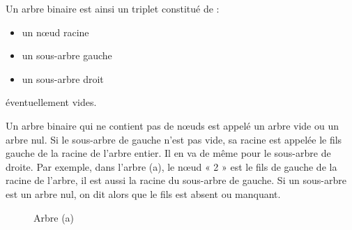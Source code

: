 \documentclass{report}
\begin{document}
Un arbre binaire est ainsi un triplet constitué de :
\begin{itemize}
\item un nœud racine
\item un sous-arbre gauche
\item un sous-arbre droit
\end{itemize}
éventuellement vides.

Un arbre binaire qui ne contient pas de nœuds est appelé un arbre vide ou un arbre nul.
Si le sous-arbre de gauche n'est pas vide, sa racine est appelée le fils gauche de la racine de l'arbre entier. Il en va de même pour le sous-arbre de droite.
Par exemple, dans l'arbre (a), le nœud « 2 » est le fils de gauche de la racine de l'arbre, il est aussi la racine du sous-arbre de gauche.
Si un sous-arbre est un arbre nul, on dit alors que le fils est absent ou manquant.
\begin{figure}
\begin{center}
\end{center}
\caption{Arbre (a)} \label{fig:Exemples d'arbres}
\end{figure}
\end{document}
